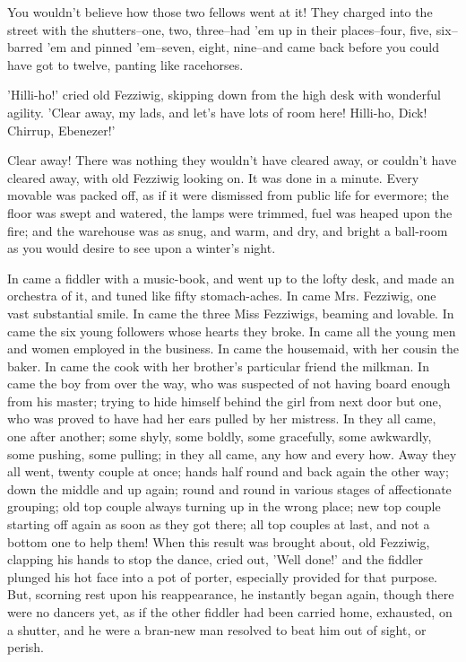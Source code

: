 You wouldn't believe how those two fellows went at it! They charged into
the street with the shutters--one, two, three--had 'em up in their
places--four, five, six--barred 'em and pinned 'em--seven, eight,
nine--and came back before you could have got to twelve, panting like
racehorses.

'Hilli-ho!' cried old Fezziwig, skipping down from the high desk with
wonderful agility. 'Clear away, my lads, and let's have lots of room
here! Hilli-ho, Dick! Chirrup, Ebenezer!'

Clear away! There was nothing they wouldn't have cleared away, or
couldn't have cleared away, with old Fezziwig looking on. It was done in
a minute. Every movable was packed off, as if it were dismissed from
public life for evermore; the floor was swept and watered, the lamps
were trimmed, fuel was heaped upon the fire; and the warehouse was as
snug, and warm, and dry, and bright a ball-room as you would desire to
see upon a winter's night.

In came a fiddler with a music-book, and went up to the lofty desk, and
made an orchestra of it, and tuned like fifty stomach-aches. In came
Mrs. Fezziwig, one vast substantial smile. In came the three Miss
Fezziwigs, beaming and lovable. In came the six young followers whose
hearts they broke. In came all the young men and women employed in the
business. In came the housemaid, with her cousin the baker. In came the
cook with her brother's particular friend the milkman. In came the boy
from over the way, who was suspected of not having board enough from his
master; trying to hide himself behind the girl from next door but one,
who was proved to have had her ears pulled by her mistress. In they all
came, one after another; some shyly, some boldly, some gracefully, some
awkwardly, some pushing, some pulling; in they all came, any how and
every how. Away they all went, twenty couple at once; hands half round
and back again the other way; down the middle and up again; round and
round in various stages of affectionate grouping; old top couple always
turning up in the wrong place; new top couple starting off again as soon
as they got there; all top couples at last, and not a bottom one to help
them! When this result was brought about, old Fezziwig, clapping his
hands to stop the dance, cried out, 'Well done!' and the fiddler plunged
his hot face into a pot of porter, especially provided for that purpose.
But, scorning rest upon his reappearance, he instantly began again,
though there were no dancers yet, as if the other fiddler had been
carried home, exhausted, on a shutter, and he were a bran-new man
resolved to beat him out of sight, or perish.

